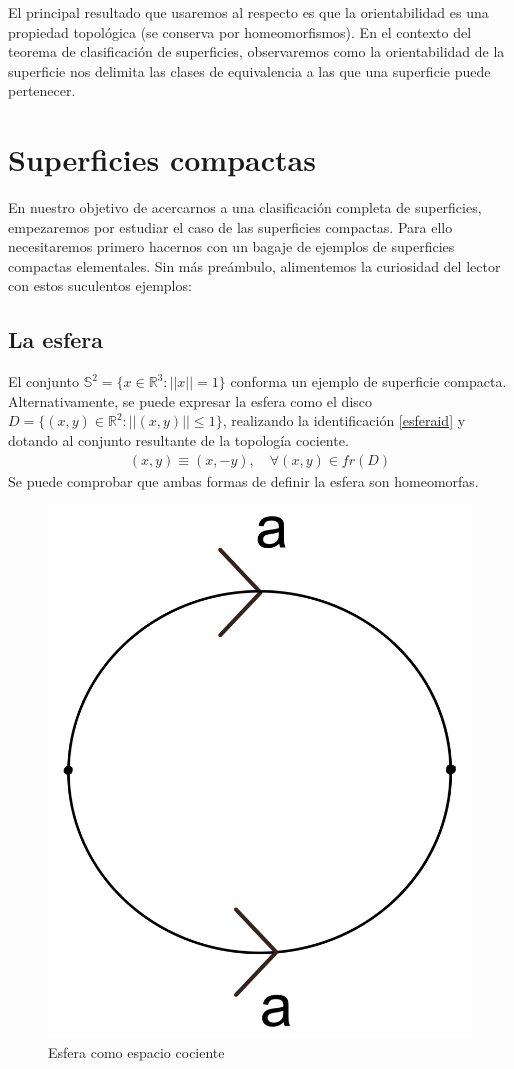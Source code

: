 \documentclass[a4paper,11pt,spanish, twoside, leqno]{tfg-uam}
\theoremstyle{definition}
\begin{document}
El principal resultado que usaremos al respecto es que la orientabilidad es una propiedad topológica (se conserva por homeomorfismos). En el contexto del teorema de clasificación de superficies, observaremos como la orientabilidad de la superficie nos delimita las clases de equivalencia a las que una superficie puede pertenecer.

\section{Superficies compactas}

En nuestro objetivo de acercarnos a una clasificación  completa de superficies, empezaremos por estudiar el caso de las superficies compactas. Para ello necesitaremos primero hacernos con un bagaje de ejemplos de superficies compactas elementales. Sin más preámbulo, alimentemos la curiosidad del lector con estos suculentos ejemplos:

\subsection*{La esfera}
El conjunto $ \mathbb{S}^2 = \{x\in \mathbb{R}^3: ||x||=1 \} $ conforma un ejemplo de superficie compacta. Alternativamente, se puede expresar la esfera como el disco $ D = \{(x,y)\in\mathbb{R}^2: ||(x,y)||\leq1 \} $, realizando la identificación  \ref{esferaid} y dotando al conjunto resultante de la topología cociente.
\begin{align}\label{esferaid}
	(x,y)\equiv(x,-y),\quad\forall(x,y)\in fr(D)
\end{align}
Se puede comprobar que ambas formas de definir la esfera son homeomorfas. 

\begin{figure}[h!]
	\centering
	\includegraphics[width=0.15\linewidth]{imagenes/esfera_plana.png}
	\caption{Esfera como espacio cociente}
	\label{fig:esfera expresion canonica}
\end{figure} 
\end{document}
